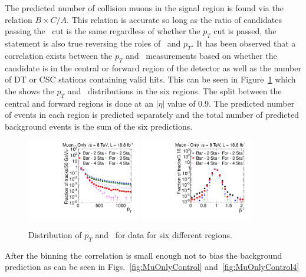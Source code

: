 The predicted number of collision muons in the signal region is found via the relation $B \times C / A$. This relation is accurate so long as the ratio of candidates
passing the \invbeta\ cut is the same regardless of whether the $p_T$ cut is passed, the statement is also true reversing the roles of \invbeta\ and $p_T$.
It has been observed that a correlation exists between the $p_T$ and \invbeta\ measurements based on whether the candidate is in the central or forward
region of the detector as well as the number of DT or CSC stations containing valid hits. This can be seen in Figure~\ref{fig:SelVarBinned} which the shows the $p_T$
and \invbeta\ distributions in the six regions. The split between the central and forward regions is done at an $|\eta|$ value of 0.9. The predicted number of events
in each region is predicted separately and the total number of predicted background events is the sum of the six predictions.

\begin{figure}
\centering
  \includegraphics[clip=true, trim=0.0cm 0cm 2.8cm 0cm, width=0.44\textwidth]{figures/muonly/Selection_Data8TeV_Pt_Binned_BS}
  \includegraphics[clip=true, trim=0.0cm 0cm 2.8cm 0cm, width=0.44\textwidth]{figures/muonly/Selection_Data8TeV_TOF_Binned_BS}
  \caption{Distribution of $p_T$ and \invbeta\ for data for six different regions.
    \label{fig:SelVarBinned}}
\end{figure}

After the binning the correlation is small enough not to bias the background prediction as can be seen in Figs.~\ref{fig:MuOnlyControl} and~\ref{fig:MuOnlyControl4}

